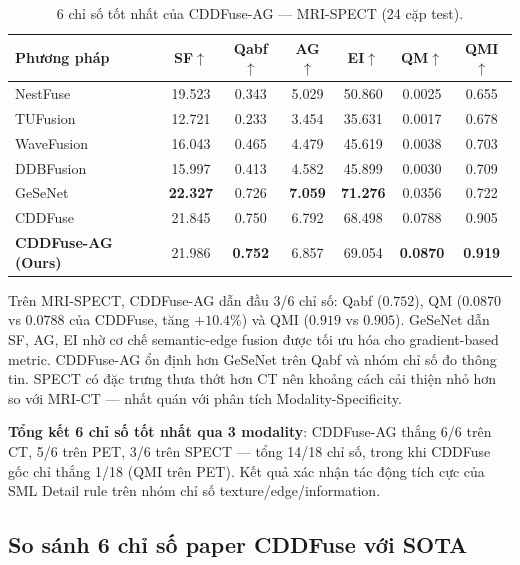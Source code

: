 \documentclass[12pt,a4paper]{article}
\begin{document}
\begin{table}[H]
\centering
\caption{6 chỉ số tốt nhất của CDDFuse-AG --- MRI-SPECT (24 cặp test).}
\label{tab:best6-spect}
\small
\setlength{\tabcolsep}{5pt}
\begin{tabular}{lcccccc}
\toprule
\textbf{Phương pháp} & \textbf{SF}$\uparrow$ & \textbf{Qabf}$\uparrow$ & \textbf{AG}$\uparrow$ & \textbf{EI}$\uparrow$ & \textbf{QM}$\uparrow$ & \textbf{QMI}$\uparrow$ \\
\midrule
NestFuse~\cite{li2020nestfuse}       & 19.523 & 0.343 & 5.029 & 50.860 & 0.0025 & 0.655 \\
TUFusion~\cite{zhao2024tufusion}     & 12.721 & 0.233 & 3.454 & 35.631 & 0.0017 & 0.678 \\
WaveFusion~\cite{wang2025wavefusion} & 16.043 & 0.465 & 4.479 & 45.619 & 0.0038 & 0.703 \\
DDBFusion~\cite{zhang2025ddbfusion}  & 15.997 & 0.413 & 4.582 & 45.899 & 0.0030 & 0.709 \\
GeSeNet~\cite{li2023gesenet}         & \textbf{22.327} & 0.726 & \textbf{7.059} & \textbf{71.276} & 0.0356 & 0.722 \\
CDDFuse~\cite{zhao2023cddfuse}       & 21.845 & 0.750 & 6.792 & 68.498 & 0.0788 & 0.905 \\
\midrule
\textbf{CDDFuse-AG (Ours)}           & 21.986 & \textbf{0.752} & 6.857 & 69.054 & \textbf{0.0870} & \textbf{0.919} \\
\bottomrule
\end{tabular}
\end{table}

Trên MRI-SPECT, CDDFuse-AG dẫn đầu 3/6 chỉ số: Qabf ($0.752$), QM ($0.0870$ vs
$0.0788$ của CDDFuse, tăng $+10.4\%$) và QMI ($0.919$ vs $0.905$). GeSeNet dẫn
SF, AG, EI nhờ cơ chế semantic-edge fusion được tối ưu hóa cho gradient-based
metric. CDDFuse-AG ổn định hơn GeSeNet trên Qabf và nhóm chỉ số đo thông tin.
SPECT có đặc trưng thưa thớt hơn CT nên khoảng cách cải thiện nhỏ hơn so với
MRI-CT --- nhất quán với phân tích Modality-Specificity.

\textbf{Tổng kết 6 chỉ số tốt nhất qua 3 modality}: CDDFuse-AG thắng 6/6 trên
CT, 5/6 trên PET, 3/6 trên SPECT --- tổng 14/18 chỉ số, trong khi CDDFuse gốc
chỉ thắng 1/18 (QMI trên PET). Kết quả xác nhận tác động tích cực của SML Detail
rule trên nhóm chỉ số texture/edge/information.

\subsection{So sánh 6 chỉ số paper CDDFuse với SOTA}
\end{document}

